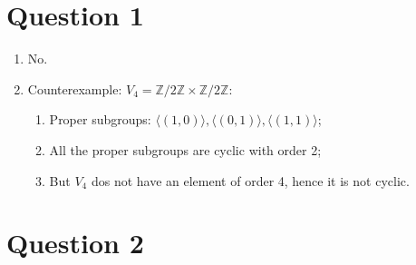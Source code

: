 \documentclass[11pt]{article}
\newcommand{\ZZ}{\mathbb{Z}}
\begin{document}
\section*{Question 1}

\begin{enumerate}
    \item No.
    \item Counterexample: $V_4=\ZZ/2\ZZ\times \ZZ/2\ZZ$:
    \begin{enumerate}
        \item Proper subgroups: $\langle(1,0)\rangle,\langle(0,1)\rangle,\langle(1,1)\rangle$;
        \item All the proper subgroups are cyclic with order 2;
        \item But $V_4$ dos not have an element of order 4, hence it is not cyclic.
    \end{enumerate}
\end{enumerate}

\newpage

\section*{Question 2}
\end{document}
